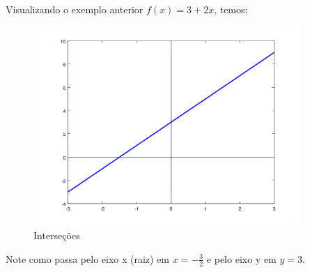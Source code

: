 \documentclass[11pt]{article}
\begin{document}
\paragraph{}
Visualizando o exemplo anterior $f(x) = 3 + 2x$, temos:
\begin{figure}[H]
\centering
\includegraphics[width=0.9\textwidth]{imgs/raiz.png}
\caption[9pt]{Interseções}
\end{figure}
Note como passa pelo eixo x (raiz) em $x=-\frac{3}{2}$ e pelo eixo y em 
$y=3$.

\newpage
\end{document}

